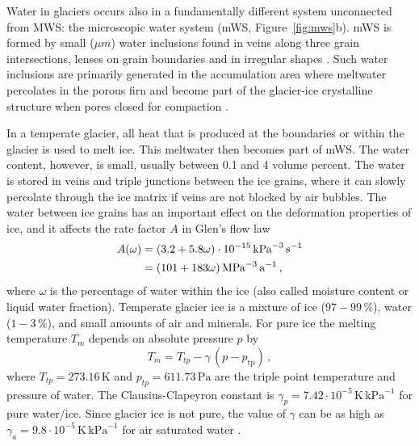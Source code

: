 \documentclass[parskip=half]{scrartcl}
\newcommand{\unit}[1]{\ensuremath{\,\mathrm{#1}}}
\begin{document}
Water in glaciers occurs also in a fundamentally different system unconnected from MWS: the microscopic water system (mWS, Figure~\ref{fig:mws}b). mWS is formed by small ($\mu m$) water inclusions found in veins along three grain intersections, lenses on grain boundaries and in irregular shapes \citep{RaymondHarrison1975,Nye1989,Mader1992,FountainWalder1998}. Such water inclusions are primarily generated in the accumulation area where meltwater percolates in the porous firn and become part of the glacier-ice crystalline structure when pores closed for compaction \citep{Paterson1971,Lliboutry1976,Pettersson2004}.


In a temperate glacier, all heat that is produced at the boundaries or within
the glacier is used to melt ice. This meltwater then becomes part of mWS. The water content, however, is small, usually
between 0.1 and 4 volume percent.  The water is stored in veins and triple
junctions between the ice grains, where it can slowly percolate through the
ice matrix if veins are not blocked by air bubbles.  The water between ice
grains has an important effect on the deformation properties of ice, and it
affects the rate factor $A$ in Glen's flow law \citep{Duval1977,Paterson1994}
%
\begin{align}
 \label{eq:ratefactor-water}
 A(\omega) &= (3.2 + 5.8 \omega) \cdot 10^{-15} \unit{kPa}^{-3}\unit{s}^{-1}
 \notag\\
 &= (101 + 183\omega) \unit{MPa}^{-3}\unit{a}^{-1}\,,
\end{align}
%
where $\omega$ is the percentage of water within the ice (also called moisture content or liquid water fraction).
%
Temperate glacier ice is a mixture of ice ($97-99\unit{\%}$), water
($1-3\unit{\%}$), and small amounts of air and minerals.  For pure ice the
melting temperature $T_m$ depends on absolute pressure $p$ by
%
\begin{equation}
 \label{eq:clausius-pure}
 T_m = T_{tp} - \gamma\, (p - p_{\text{tp}})\,,
\end{equation}
% 
where $T_{tp}=273.16\unit{K}$ and $p_{tp}=611.73\unit{Pa}$ are the triple
point temperature and pressure of water.  The Clausius-Clapeyron constant is
$\gamma_{p}= 7.42 \cdot 10^{-5} \unit{K}\unit{kPa}^{-1}$ for pure water/ice.
Since glacier ice is not pure, the value of $\gamma$ can be as high as
$\gamma_a = 9.8 \cdot 10^{-5} \unit{K}\unit{kPa}^{-1}$ for air saturated water
\citep{Harrison1975a}.

\end{document}
